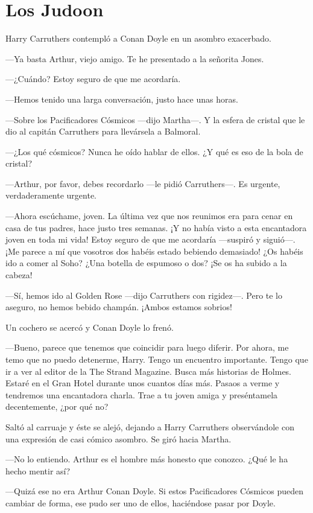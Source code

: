 \chapter*{Los Judoon}

Harry Carruthers contempló a Conan Doyle en un asombro exacerbado.

---Ya basta Arthur, viejo amigo. Te he presentado a la señorita Jones.

---¿Cuándo? Estoy seguro de que me acordaría.

---Hemos tenido una larga conversación, justo hace unas horas.

---Sobre los Pacificadores Cósmicos ---dijo Martha---. Y la esfera de
cristal que le dio al capitán Carruthers para llevársela a Balmoral.

---¿Los qué cósmicos? Nunca he oído hablar de ellos. ¿Y qué es eso de
la bola de cristal?

---Arthur, por favor, debes recordarlo ---le pidió Carruthers---. Es
urgente, verdaderamente urgente.

---Ahora escúchame, joven. La última vez que nos reunimos era para cenar
en casa de tus padres, hace justo tres semanas. ¡Y no había visto a esta
encantadora joven en toda mi vida! Estoy seguro de que me acordaría
---suspiró y siguió---. ¡Me parece a mí que vosotros dos habéis estado
bebiendo demasiado! ¿Os habéis ido a comer al Soho? ¿Una botella de
espumoso o dos? ¡Se os ha subido a la cabeza!

---Sí, hemos ido al Golden Rose ---dijo Carruthers con rigidez---. Pero
te lo aseguro, no hemos bebido champán. ¡Ambos estamos sobrios!

Un cochero se acercó y Conan Doyle lo frenó.

---Bueno, parece que tenemos que coincidir para luego diferir. Por
ahora, me temo que no puedo detenerme, Harry. Tengo un encuentro
importante. Tengo que ir a ver al editor de la The Strand Magazine.
Busca más historias de Holmes. Estaré en el Gran Hotel durante unos
cuantos días más. Pasaos a verme y tendremos una encantadora charla.
Trae a tu joven amiga y preséntamela decentemente, ¿por qué no?

Saltó al carruaje y éste se alejó, dejando a Harry Carruthers
observándole con una expresión de casi cómico asombro. Se giró hacia
Martha.

---No lo entiendo. Arthur es el hombre más honesto que conozco. ¿Qué le
ha hecho mentir así?

---Quizá ese no era Arthur Conan Doyle. Si estos Pacificadores Cósmicos
pueden cambiar de forma, ese pudo ser uno de ellos, haciéndose pasar por
Doyle.

